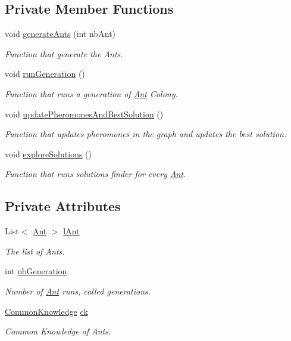 \subsection*{Private Member Functions}
\begin{DoxyCompactItemize}
\item 
void \hyperlink{classAntColony_a8e9a1c034219714ae24303e37f808af1}{generate\+Ants} (int nb\+Ant)
\begin{DoxyCompactList}\small\item\em Function that generate the Ants. \end{DoxyCompactList}\item 
void \hyperlink{classAntColony_a4b04a4d6dea0cf1edb4c08bf9fb8a76a}{run\+Generation} ()
\begin{DoxyCompactList}\small\item\em Function that runs a generation of \hyperlink{classAnt}{Ant} Colony. \end{DoxyCompactList}\item 
void \hyperlink{classAntColony_a488ce21997f558be3064f0a90fcc0dcb}{update\+Pheromones\+And\+Best\+Solution} ()
\begin{DoxyCompactList}\small\item\em Function that updates pheromones in the graph and updates the best solution. \end{DoxyCompactList}\item 
void \hyperlink{classAntColony_ab60f421de9a669f4530175c92ecf07fe}{explore\+Solutions} ()
\begin{DoxyCompactList}\small\item\em Function that runs solutions finder for every \hyperlink{classAnt}{Ant}. \end{DoxyCompactList}\end{DoxyCompactItemize}
\subsection*{Private Attributes}
\begin{DoxyCompactItemize}
\item 
List$<$ \hyperlink{classAnt}{Ant} $>$ \hyperlink{classAntColony_acd3a0782e201bb61c87c89682859e80b}{l\+Ant}
\begin{DoxyCompactList}\small\item\em The list of Ants.\end{DoxyCompactList}\item 
int \hyperlink{classAntColony_a8c57e1c9b4292d9efa2b9706c48dc55c}{nb\+Generation}
\begin{DoxyCompactList}\small\item\em Number of \hyperlink{classAnt}{Ant} runs, called generations.\end{DoxyCompactList}\item 
\hyperlink{classCommonKnowledge}{Common\+Knowledge} \hyperlink{classAntColony_a270c695b01a8b559b2e691fafcf090cc}{ck}
\begin{DoxyCompactList}\small\item\em Common Knowledge of Ants.\end{DoxyCompactList}\end{DoxyCompactItemize}


